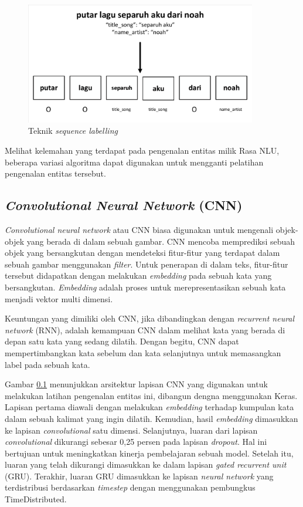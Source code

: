 \begin{figure}[H]
	\centering
	\includegraphics[width=0.9\textwidth, trim=2 2 2 2, clip]{resources/3/sequence_labelling.pdf}
	\caption{Teknik \textit{sequence labelling}}
	\label{fig:sequence_labelling}
\end{figure}

Melihat kelemahan yang terdapat pada pengenalan entitas milik Rasa NLU, beberapa variasi algoritma dapat digunakan untuk mengganti pelatihan pengenalan entitas tersebut.

\subsection{\textit{Convolutional Neural Network} (CNN)}

\textit{Convolutional neural network} atau CNN biasa digunakan untuk mengenali objek-objek yang berada di dalam sebuah gambar. CNN mencoba memprediksi sebuah objek yang bersangkutan dengan mendeteksi fitur-fitur yang terdapat dalam sebuah gambar menggunakan \textit{filter}. Untuk penerapan di dalam teks, fitur-fitur tersebut didapatkan dengan melakukan \textit{embedding} pada sebuah kata yang bersangkutan. \textit{Embedding} adalah proses untuk merepresentasikan sebuah kata menjadi vektor multi dimensi.

Keuntungan yang dimiliki oleh CNN, jika dibandingkan dengan \textit{recurrent neural network} (RNN), adalah kemampuan CNN dalam melihat kata yang berada di depan satu kata yang sedang dilatih. Dengan begitu, CNN dapat mempertimbangkan kata sebelum dan kata selanjutnya untuk memasangkan label pada sebuah kata.

Gambar \ref{} menunjukkan arsitektur lapisan CNN yang digunakan untuk melakukan latihan pengenalan entitas ini, dibangun dengna menggunakan Keras. Lapisan pertama diawali dengan melakukan \textit{embedding} terhadap kumpulan kata dalam sebuah kalimat yang ingin dilatih. Kemudian, hasil \textit{embedding} dimasukkan ke lapisan \textit{convolutional} satu dimensi. Selanjutnya, luaran dari lapisan \textit{convolutional} dikurangi sebesar 0,25 persen pada lapisan \textit{dropout}. Hal ini bertujuan untuk meningkatkan kinerja pembelajaran sebuah model. Setelah itu, luaran yang telah dikurangi dimasukkan ke dalam lapisan \textit{gated recurrent unit} (GRU). Terakhir, luaran GRU dimasukkan ke lapisan \textit{neural network} yang terdistribusi berdasarkan \textit{timestep} dengan menggunakan pembungkus TimeDistributed.

